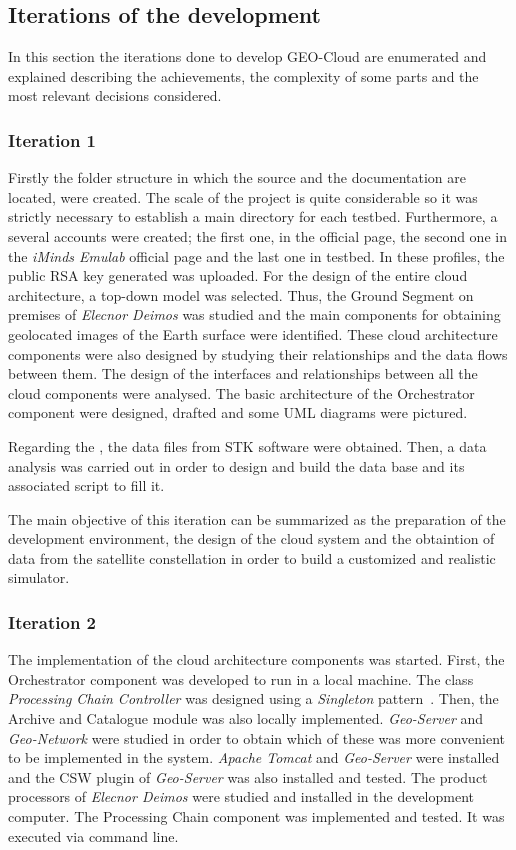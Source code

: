 \subsection{Iterations of the development}

In this section the iterations done to develop GEO-Cloud are
enumerated and explained describing the achievements, the complexity of some
parts and the most relevant decisions considered.

\subsubsection{Iteration 1}

Firstly the folder structure in which the source and the documentation are
located, were created. The scale of the project is quite considerable so it was
strictly necessary to establish a main directory for each testbed. Furthermore,
a several accounts were created; the first one, in the \bonfire official page,
the second one in the \emph{iMinds Emulab} official page and the last one in \pl
testbed. In these profiles, the
public \ac{RSA} key generated was uploaded.
For the design of the entire cloud architecture, a top-down model was
selected. Thus, the Ground Segment on premises of \emph{Elecnor Deimos} was
studied and the main components for obtaining geolocated images of the Earth
surface were identified. These cloud architecture components were also designed by
studying their relationships and the data flows between them. The design of the
interfaces and relationships between all the cloud components were analysed. 
The basic architecture of the Orchestrator component were
designed, drafted and some \ac{UML} diagrams were pictured. 

Regarding the \sss, the data files from \ac{STK} software were obtained. Then, a data analysis was carried out in order
to design and build the data base and its associated script to fill it.


The main objective of this iteration can be summarized as the preparation
of the development environment, the design of the cloud system and the
obtaintion of data from the satellite constellation in order to build a
customized and realistic simulator.

\subsubsection{Iteration 2}

The implementation of the cloud architecture components was started. First, the
Orchestrator component was developed to run in a local machine. The class
\emph{Processing Chain Controller} was designed using a \emph{Singleton} pattern~\cite{Garcia2013}. Then, the
Archive and Catalogue module was also locally implemented. \emph{Geo-Server} and
\emph{Geo-Network} were studied in order to obtain which of these was more convenient
to be implemented in the system. \emph{Apache Tomcat} and \emph{Geo-Server}
were installed and the \ac{CSW} plugin of \emph{Geo-Server} was also installed
and tested.
The product processors of \emph{Elecnor Deimos} were studied and installed in
the development computer. The Processing Chain component was implemented and
tested. It was executed via command line.

